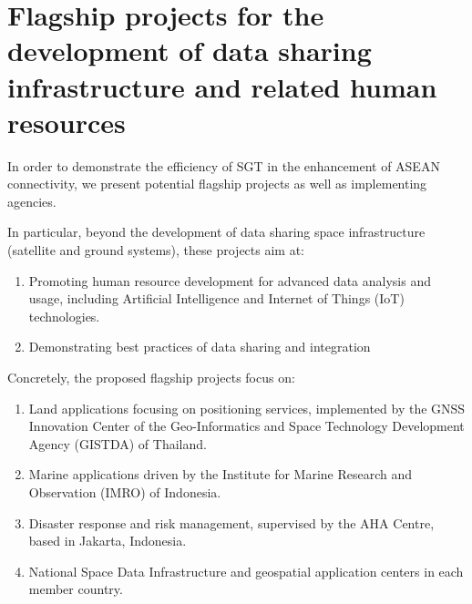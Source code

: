 \section{Flagship projects for the development of data sharing infrastructure and related human resources} \label{flagship}

\tab In order to demonstrate the efficiency of SGT in the enhancement of ASEAN connectivity, we present potential flagship projects as well as implementing agencies.

\vspace{0.4 cm}

In particular, beyond the development of data sharing space infrastructure (satellite and ground systems), these projects aim at:

\begin{enumerate}
\item Promoting human resource development for advanced data analysis and usage, including Artificial Intelligence and Internet of Things (IoT) technologies.
\item Demonstrating best practices of data sharing and integration
\end{enumerate}

Concretely, the proposed flagship projects focus on:

\begin{enumerate}

\item Land applications focusing on positioning services, implemented by the GNSS Innovation Center of the Geo-Informatics and Space Technology Development Agency (GISTDA) of Thailand.

\item Marine applications driven by the Institute for Marine Research and Observation (IMRO) of Indonesia.

\item Disaster response and risk management, supervised by the AHA Centre, based in Jakarta, Indonesia.

\item National Space Data Infrastructure and geospatial application centers in each member country.

\end{enumerate}


